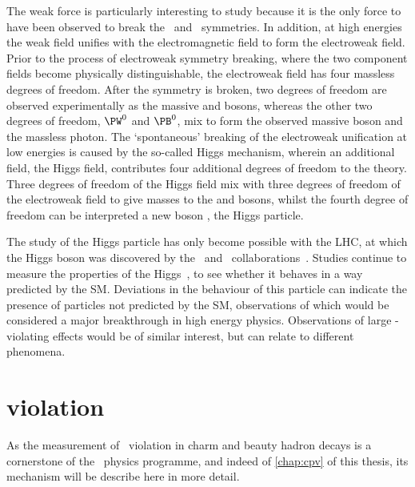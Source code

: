 The weak force is particularly interesting to study because it is the only 
force to have been observed to break the \Ptransform\ and \CP\ symmetries.
In addition, at high energies the weak field unifies with the electromagnetic 
field to form the electroweak field.
Prior to the process of electroweak symmetry breaking, where the two component 
fields become physically distinguishable, the electroweak field has four 
massless degrees of freedom.
After the symmetry is broken, two degrees of freedom are observed 
experimentally as the massive \PWp and \PWm bosons, whereas the other two 
degrees of freedom, $\PW^{0}$ and $\PB^{0}$, mix to form the observed massive 
\PZ boson and the massless photon.
The `spontaneous' breaking of the electroweak unification at low energies is 
caused by the so-called Higgs mechanism, wherein an additional field, the Higgs
field, contributes four additional degrees of freedom to the theory.
Three degrees of freedom of the Higgs field mix with three degrees of freedom 
of the electroweak field to give masses to the \PWpm and \PZ bosons, whilst the 
fourth degree of freedom can be interpreted a new boson \PH, the Higgs 
particle.

The study of the Higgs particle has only become possible with the \ac{LHC}, at 
which the Higgs boson was discovered by the \atlas\ and \cms\ 
collaborations~\cite{Aad:2012tfa,Chatrchyan:2012xdj}.
Studies continue to measure the properties of the 
Higgs~\cite{Khachatryan:2016vau}, to see whether it behaves in a way predicted 
by the \ac{SM}.
Deviations in the behaviour of this particle can indicate the presence of 
particles not predicted by the \ac{SM}, observations of which would be 
considered a major breakthrough in high energy physics.
Observations of large \CP-violating effects would be of similar interest, but 
can relate to different phenomena.

\section{\texorpdfstring{\CP}{CP} violation}
\label{chap:intro:sm:cp}

As the measurement of \CP\ violation in charm and beauty hadron decays is a 
cornerstone of the \lhcb\ physics programme, and indeed of \cref{chap:cpv} of 
this thesis, its mechanism will be describe here in more detail.

